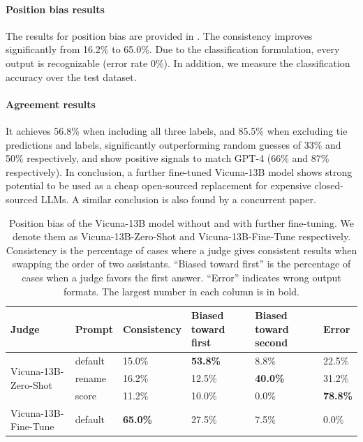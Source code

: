 \paragraph{Position bias results}
The results for position bias are provided in .
The consistency improves significantly from 16.2\% to 65.0\%. Due to the classification formulation, every output is recognizable (error rate 0\%).
In addition, we measure the classification accuracy over the test dataset.

\paragraph{Agreement results}
It achieves 56.8\% when including all three labels, and 85.5\% when excluding tie predictions and labels, significantly outperforming random guesses of 33\% and 50\% respectively, and show positive signals to match GPT-4 (66\% and 87\% respectively).
In conclusion, a further fine-tuned Vicuna-13B model shows strong potential to be used as a cheap open-sourced replacement for expensive closed-sourced LLMs. A similar conclusion is also found by a concurrent paper\cite{wang2023pandalm}. 

\begin{table}[h]
\centering
\footnotesize
\caption{Position bias of the Vicuna-13B model without and with further fine-tuning. We denote them as Vicuna-13B-Zero-Shot and Vicuna-13B-Fine-Tune respectively. Consistency is the percentage of cases where a judge gives consistent results when swapping the order of two assistants. ``Biased toward first'' is the percentage of cases when a judge favors the first answer. ``Error'' indicates wrong output formats. The largest number in each column is in bold.}
\label{tab:position_bias_vicuna}

\begin{tabular}{@{}llllll@{}}
\toprule
Judge & Prompt  & Consistency & Biased toward first & Biased toward second & Error \\
\midrule
\multirow{3}{*}{Vicuna-13B-Zero-Shot} & default & 15.0\% & \textbf{53.8\%} & 8.8\% & 22.5\% \\
 & rename & 16.2\% & 12.5\% & \textbf{40.0\%} & 31.2\% \\
 & score & 11.2\% & 10.0\% & 0.0\% & \textbf{78.8\%} \\ 
\midrule
\multirow{1}{*}{Vicuna-13B-Fine-Tune} & default & \textbf{65.0\%} & 27.5\% & 7.5\% & 0.0\% \\
\bottomrule
\end{tabular}
\end{table}



